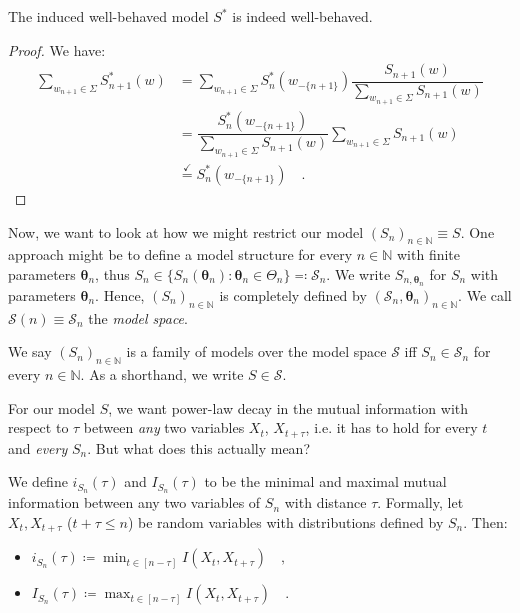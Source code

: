 \documentclass[../../main.tex]{subfiles}
\begin{document}
    \begin{lemma}
        The induced well-behaved model $S^*$ is indeed well-behaved.
    \end{lemma}
    \vspace{-2.5em}
    \begin{proof}
        We have:
        \begin{align*}
            \sum_{w_{n + 1} \in \Sigma} S_{n + 1}^*(w) &= \sum_{w_{n + 1} \in \Sigma} S_n^*(w_{-\{n+1\}}) \dfrac{S_{n+1}(w)}{\sum_{w_{n+1} \in \Sigma} S_{n+1}(w)} \\
            &= \dfrac{S_n^*(w_{-\{n+1\}})}{\sum_{w_{n+1} \in \Sigma} S_{n+1}(w)} \sum_{w_{n + 1} \in \Sigma} S_{n+1}(w) \\
            &\overset{\checkmark}{=} S_n^*(w_{-\{n+1\}}) \quad .
        \end{align*}
    \end{proof}

    Now, we want to look at how we might restrict our model $(S_n)_{n \in \mathbb{N}} \equiv S$. One approach might be to define a model structure for every $n \in \mathbb{N}$ with finite parameters $\bm{\theta}_n$, thus $S_n \in \{ S_n(\bm{\theta}_n) : \bm{\theta}_n \in \Theta_n \} \eqqcolon \mathcal{S}_n$. We write $S_{n, \bm{\theta}_n}$ for $S_n$ with parameters $\bm{\theta}_n$. Hence, $(S_n)_{n \in \mathbb{N}}$ is completely defined by $(\mathcal{S}_n, \bm{\theta}_n)_{n \in \mathbb{N}}$. We call $\mathcal{S}(n) \equiv \mathcal{S}_n$ the \emph{model space}.

    \begin{definition}
        We say $(S_n)_{n \in \mathbb{N}}$ is a family of models over the model space $\mathcal{S}$ iff $S_n \in \mathcal{S}_n$ for every $n \in \mathbb{N}$. As a shorthand, we write $S \in \mathcal{S}$.
    \end{definition}

    For our model $S$, we want power-law decay in the mutual information with respect to $\tau$ between \emph{any} two variables $X_t$, $X_{t + \tau}$, i.e. it has to hold for every $t$ and \emph{every} $S_n$. But what does this actually mean?

    \begin{definition}
        We define $i_{S_n}(\tau)$ and $I_{S_n}(\tau)$ to be the minimal and maximal mutual information between any two variables of $S_n$ with distance $\tau$. Formally, let $X_t, X_{t + \tau}$ ($t + \tau \leq n$) be random variables with distributions defined by $S_n$. Then:
        \vspace{-1em}
        \begin{itemize}
            \item $i_{S_n}(\tau) \coloneqq \min_{t \in [n - \tau]} I(X_t, X_{t + \tau}) \quad ,$
            \item $I_{S_n}(\tau) \coloneqq \max_{t \in [n - \tau]} I(X_t, X_{t + \tau}) \quad .$
        \end{itemize}
    \end{definition}
\end{document}
